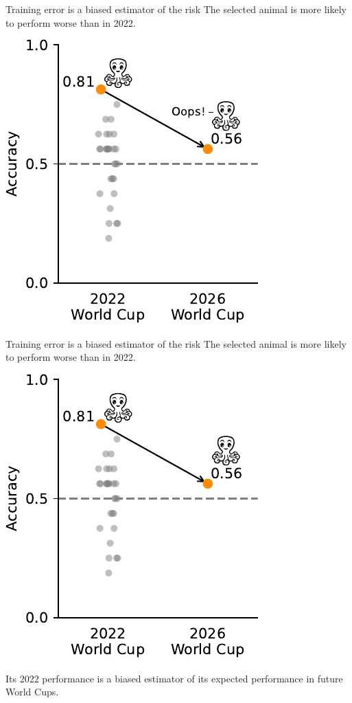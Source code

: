 \documentclass[presentation,mathserif,table]{beamer}
\begin{document}
\begin{frame}[label={sec:org1411229}]{Training error is a biased estimator of the risk}
The selected animal is more likely to perform \alert{worse} than in 2022.
\begin{center}
\includegraphics[height=.65 \textheight]{figures/generated/select_evaluate/select_evaluate_3.pdf}
\end{center}
\end{frame}
\begin{frame}[label={sec:org2f9d0d5}]{Training error is a biased estimator of the risk}
The selected animal is more likely to perform \alert{worse} than in 2022.
\begin{center}
\includegraphics[height=.65 \textheight]{figures/generated/select_evaluate/select_evaluate_3b.pdf}
\end{center}
Its 2022 performance is a \alert{biased} estimator of its expected performance in future World Cups.
\end{frame}
\end{document}
